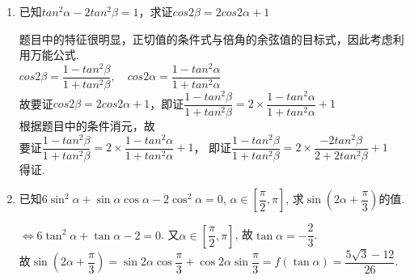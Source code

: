 \begin{enumerate}
\begin{jieda}
        ${\sin }^{2}\left( {\dfrac{\pi }{4} - \alpha }\right)  - 2{\cos }^{2}\alpha  + 1 = \dfrac{1 - \cos \left( {\dfrac{\pi }{2} - {2\alpha }}\right) }{2} - \cos {2\alpha } = \dfrac{1 - \sin {2\alpha }}{2} - \cos {2\alpha } = \dfrac{1 - \dfrac{4}{5}}{2} - \left( {-\dfrac{3}{5}}\right)  = \dfrac{7}{10}$
    \end{jieda}
    
    \item 已知$tan^2\alpha - 2tan^2\beta = 1$，求证$cos2\beta = 2cos2\alpha + 1$
    \begin{jieda}
        题目中的特征很明显，正切值的条件式与倍角的余弦值的目标式，因此考虑利用万能公式.\\
        $cos2\beta = \dfrac{1-tan^2\beta}{1+tan^2\beta},\quad cos2\alpha = \dfrac{1-tan^2\alpha}{1+tan^2\alpha}$\\
        故要证$cos2\beta = 2cos2\alpha + 1$，即证$\dfrac{1-tan^2\beta}{1+tan^2\beta} = 2 \times \dfrac{1-tan^2\alpha}{1+tan^2\alpha} + 1$ \\
        根据题目中的条件消元，故 \\
        要证$\dfrac{1-tan^2\beta}{1+tan^2\beta} = 2 \times \dfrac{1-tan^2\alpha}{1+tan^2\alpha} + 1$， 即证$\dfrac{1-tan^2\beta}{1+tan^2\beta} = 2 \times \dfrac{-2tan^2\beta}{2+2tan^2\beta} + 1$ \\
        得证.
    \end{jieda}
    \item 已知$6\sin^2\alpha+\sin\alpha\cos\alpha-2\cos^2\alpha=0$, $\alpha\in\left[\dfrac{\pi}{2},\pi\right]$, 求$\sin\left(2\alpha+\dfrac{\pi}{3}\right)$的值. 
    \begin{jieda}
    $\iff 6\tan^2\alpha+\tan\alpha-2=0$. 又$\alpha\in\left[\dfrac{\pi}{2},\pi\right]$, 故$\tan\alpha=-\dfrac{2}{3}$. \\
    故$\sin\left(2\alpha+\dfrac{\pi}{3}\right)=\sin2\alpha\cos\dfrac{\pi}{3}+\cos2\alpha\sin\dfrac{\pi}{3}=f(\tan\alpha)=\dfrac{5\sqrt{3}-12}{26}$. 
    \end{jieda}
\end{enumerate}

